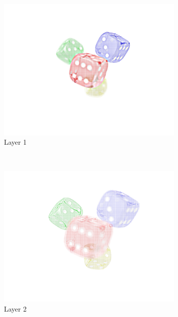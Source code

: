 \documentclass[11pt,a4paper,titlepage]{article}
\begin{document}
\clearpage
\begin{figure}[h]
	\centering
	\begin{subfigure}[c]{0.3\textwidth}
 		\includegraphics[width=\textwidth]{results/dice_perspective_rec_3Layers_r=1/1.png}
  		\caption{Layer 1}
	\end{subfigure}%
	~
	\begin{subfigure}[c]{0.3\textwidth}
		\includegraphics[width=\textwidth]{results/dice_perspective_rec_3Layers_r=1/2.png}
		\caption{Layer 2}
	\end{subfigure}%
	~
	\begin{subfigure}[c]{0.3\textwidth}

\end{subfigure}
\end{figure}
\end{document}
